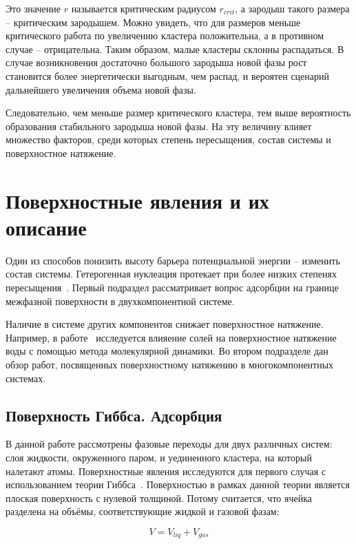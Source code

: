 Это значение $r$ называется критическим радиусом $r_{crit}$, а зародыш такого размера \--- критическим зародышем. Можно увидеть, что для размеров меньше критического работа по увеличению кластера положительна, а в противном случае \--- отрицательна. Таким образом, малые кластеры склонны распадаться. В случае возникновения достаточно большого зародыша новой фазы рост становится более энергетически выгодным, чем распад, и вероятен сценарий дальнейшего увеличения объема новой фазы.  

Следовательно, чем меньше размер критического кластера, тем выше вероятность образования стабильного зародыша новой фазы. На эту величину влияет множество факторов, среди которых степень пересыщения, состав системы и поверхностное натяжение.  


\section{Поверхностные явления и их описание}

Один из способов понизить высоту барьера потенциальной энергии \--- изменить состав системы. Гетерогенная нуклеация протекает при более низких степенях пересыщения~\cite{prutton_surface_2000}. Первый подраздел рассматривает вопрос адсорбции на границе межфазной поверхности в двухкомпонентной системе.

Наличие в системе других компонентов снижает поверхностное натяжение. Например, в работе~\cite{bhatt_molecular_2004} исследуется влияение солей на поверхностное натяжение воды с помощью метода молекулярной динамики. Во втором подразделе дан обзор работ, посвященных поверхностному натяжению в многокомпонентных системах.

\subsection{Поверхность Гиббса. Адсорбция}

В данной работе рассмотрены фазовые переходы для двух различных систем: слоя жидкости, окруженного паром, и уединенного кластера, на который налетают атомы. Поверхностные явления исследуются для первого случая с использованием теории Гиббса~\cite{kalikmanov_nucleation_2013}. Поверхностью в рамках данной теории является плоская поверхность с нулевой толщиной. Потому считается, что ячейка разделена на объёмы, соответствующие жидкой и газовой фазам:

\begin{equation}
    V = V_{liq} + V_{gas}
\end{equation}

